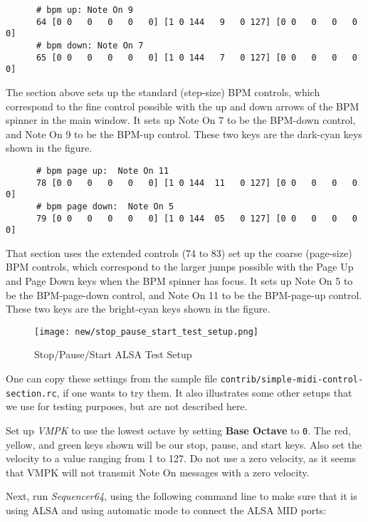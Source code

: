   \begin{verbatim}
      # bpm up: Note On 9
      64 [0 0   0   0   0   0] [1 0 144   9   0 127] [0 0   0   0   0   0]
      # bpm down: Note On 7
      65 [0 0   0   0   0   0] [1 0 144   7   0 127] [0 0   0   0   0   0]
   \end{verbatim}

   The section above sets up the standard (step-size) BPM controls, which
   correspond to the fine control possible with the up and down arrows of the
   BPM spinner in the main window.  It sets up Note On 7 to be the BPM-down
   control, and Note On 9 to be the BPM-up control.  These two keys are the
   dark-cyan keys shown in the figure.

   \begin{verbatim}
      # bpm page up:  Note On 11
      78 [0 0   0   0   0   0] [1 0 144  11   0 127] [0 0   0   0   0   0]
      # bpm page down:  Note On 5
      79 [0 0   0   0   0   0] [1 0 144  05   0 127] [0 0   0   0   0   0]
   \end{verbatim}

   That section uses the extended controls (74 to 83) set up the coarse
   (page-size) BPM controls, which correspond to the larger jumps possible with
   the Page Up and Page Down keys when the BPM spinner has focus.  It sets up
   Note On 5 to be the BPM-page-down control, and Note On 11 to be the
   BPM-page-up control.  These two keys are
   the bright-cyan keys shown in the figure.

\begin{figure}[H]
   \centering 
   \texttt{[image: new/stop\_pause\_start\_test\_setup.png]}
   \caption{Stop/Pause/Start ALSA Test Setup}
   \label{fig:rc_file_stop_pause_start_alsa_test_setup}
\end{figure}

   One can copy these settings from the sample file
   \texttt{contrib/simple-midi-control-section.rc}, if one wants to
   try them.  It also illustrates some other setups that we use for testing
   purposes, but are not described here.

   Set up \textsl{VMPK} to use the lowest octave by setting
   \textbf{Base Octave} to \texttt{0}.  The red, yellow, and green
   keys shown will be our stop, pause, and start keys.
   Also set the velocity to a value ranging from 1 to 127.
   Do not use a zero velocity, as it seems that VMPK will not transmit Note On
   messages with a zero velocity.

   Next, run \textsl{Sequencer64}, using the following command line to make
   sure that it is using ALSA and using automatic mode to connect the ALSA MID
   ports:

